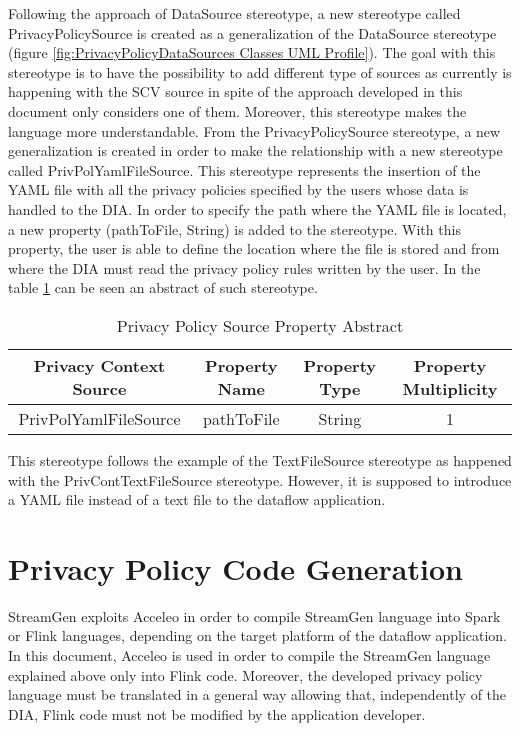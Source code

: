 Following the approach of DataSource stereotype, a new stereotype called PrivacyPolicySource is created as a generalization of the DataSource stereotype (figure \ref{fig:PrivacyPolicyDataSources Classes UML Profile}). The goal with this stereotype is to have the possibility to add different type of sources as currently is happening with the SCV source in spite of the approach developed in this document only considers one of them. Moreover, this stereotype makes the language more understandable. From the PrivacyPolicySource stereotype, a new generalization is created in order to make the relationship with a new stereotype called PrivPolYamlFileSource. This stereotype represents the insertion of the YAML file with all the privacy policies specified by the users whose data is handled to the DIA. In order to specify the path where the YAML file is located, a new property (pathToFile, String) is added to the stereotype. With this property, the user is able to define the location where the file is stored and from where the DIA must read the privacy policy rules written by the user. In the table \ref{Privacy Policy Source Property Abstract} can be seen an abstract of such stereotype.

\begin{table}[h!]
\centering
	\begin{tabular}{||c|c|c|c||} 
	\hline\hline
	Privacy Context Source & Property Name & Property Type & Property Multiplicity \\ [1ex] 
	\hline\hline
	PrivPolYamlFileSource & pathToFile & String & 1 \\
	\hline\hline
	\end{tabular}
\caption{Privacy Policy Source Property Abstract}
\label{Privacy Policy Source Property Abstract}
\end{table}

This stereotype follows the example of the TextFileSource stereotype as happened with the PrivContTextFileSource stereotype. However, it is supposed to introduce a YAML file instead of a text file to the dataflow application.

\section{Privacy Policy Code Generation}

StreamGen exploits Acceleo in order to compile StreamGen language into Spark or Flink languages, depending on the target platform of the dataflow application. In this document, Acceleo is used in order to compile the StreamGen language explained above only into Flink code. Moreover, the developed privacy policy language must be translated in a general way allowing that, independently of the DIA, Flink code must not be modified by the application developer.


